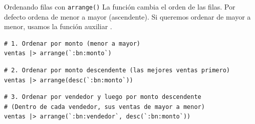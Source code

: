 \documentclass[8pt]{beamer}
\begin{document}
\begin{frame}[fragile]{Ordenando filas con \texttt{arrange()}}
La función  cambia el orden de las filas. Por defecto ordena de menor a mayor (ascendente). Si queremos ordenar de mayor a menor, usamos la función auxiliar .
\begin{lstlisting}[style=RScript]
# 1. Ordenar por monto (menor a mayor)
ventas |> arrange(`:bn:monto`)
\end{lstlisting}

\begin{lstlisting}[style=RScript]
# 2. Ordenar por monto descendente (las mejores ventas primero)
ventas |> arrange(desc(`:bn:monto`))
\end{lstlisting}

\begin{lstlisting}[style=RScript]
# 3. Ordenar por vendedor y luego por monto descendente
# (Dentro de cada vendedor, sus ventas de mayor a menor)
ventas |> arrange(`:bn:vendedor`, desc(`:bn:monto`))
\end{lstlisting}
\end{frame}
\end{document}
